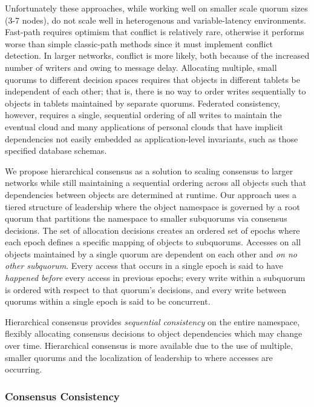 \documentclass{article}
\begin{document}
Unfortunately these approaches, while working well on smaller scale quorum sizes (3-7 nodes), do not scale well in heterogenous and variable-latency environments. Fast-path requires optimism that conflict is relatively rare, otherwise it performs worse than simple classic-path methods since it must implement conflict detection. In larger networks, conflict is more likely, both because of the increased number of writers and owing to message delay. Allocating multiple, small quorums to different decision spaces requires that objects in different tablets be independent of each other; that is, there is no way to order writes sequentially to objects in tablets maintained by separate quorums. Federated consistency, however, requires a single, sequential ordering of all writes to maintain the eventual cloud and many applications of personal clouds that have implicit dependencies not easily embedded as application-level invariants, such as those specified database schemas.

We propose hierarchical consensus as a solution to scaling consensus to larger networks while still maintaining a sequential ordering across all objects such that dependencies between objects are determined at runtime. Our approach uses a tiered structure of leadership where the object namespace is governed by a root quorum that partitions the namespace to smaller subquorums via consensus decisions. The set of allocation decisions creates an ordered set of epochs where each epoch defines a specific mapping of objects to subquorums. Accesses on all objects maintained by a single quorum are dependent on each other and \textit{on no other subquorum}. Every access that occurs in a single epoch is said to have \textit{happened before} every access in previous epochs; every write within a subquorum is ordered with respect to that quorum's decisions, and every write between quorums within a single epoch is said to be concurrent.

Hierarchical consensus provides \textit{sequential consistency} on the entire namespace, flexibly allocating consensus decisions to object dependencies which may change over time. Hierarchical consensus is more available due to the use of multiple, smaller quorums and the localization of leadership to where accesses are occurring.

\subsubsection{Consensus Consistency}
\label{sec:consensus_consistency}
\end{document}
